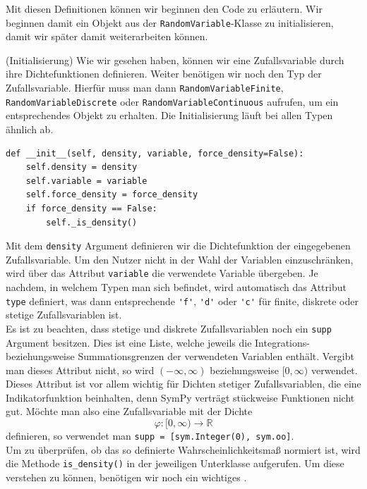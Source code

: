 Mit diesen Definitionen können wir beginnen den Code zu erläutern. Wir beginnen damit ein Objekt aus der \lstinline|RandomVariable|-Klasse zu initialisieren, damit wir später damit weiterarbeiten können.

\begin{Code}{(Initialisierung)}
\hypertarget{Code:Initialisierung}{}Wie wir gesehen haben, können wir eine Zufallsvariable durch ihre Dichtefunktionen definieren. Weiter benötigen wir noch den Typ der Zufallsvariable. Hierfür muss man dann \lstinline|RandomVariableFinite|, \lstinline|RandomVariableDiscrete| oder \lstinline|RandomVariableContinuous| aufrufen, um ein entsprechendes Objekt zu erhalten. Die Initialisierung läuft bei allen Typen ähnlich ab.
\begin{lstlisting}
def __init__(self, density, variable, force_density=False):
    self.density = density
    self.variable = variable
    self.force_density = force_density
    if force_density == False:
        self._is_density()
\end{lstlisting}
Mit dem \lstinline|density| Argument definieren wir die Dichtefunktion der eingegebenen Zufallsvariable. Um den Nutzer nicht in der Wahl der Variablen einzuschränken, wird über das Attribut \lstinline|variable| die verwendete Variable übergeben. Je nachdem, in welchem Typen man sich befindet, wird automatisch das Attribut \lstinline|type| definiert, was dann entsprechende \lstinline|'f'|, \lstinline|'d'| oder \lstinline|'c'| für finite, diskrete oder stetige Zufallsvariablen ist.\\

Es ist zu beachten, dass stetige und diskrete Zufallsvariablen noch ein \lstinline|supp| Argument besitzen. Dies ist eine Liste, welche jeweils die Integrations- beziehungsweise Summationsgrenzen der verwendeten Variablen enthält. Vergibt man dieses Attribut nicht, so wird $(- \infty, \infty)$ beziehungsweise $[0, \infty)$ verwendet. Dieses Attribut ist vor allem wichtig für Dichten stetiger Zufallsvariablen, die eine Indikatorfunktion beinhalten, denn SymPy verträgt stückweise Funktionen  nicht gut. Möchte man also eine Zufallsvariable mit der Dichte
\[\varphi: [0, \infty) \rightarrow \mathbb{R}\]
definieren, so verwendet man \lstinline|supp = [sym.Integer(0), sym.oo]|.\\
Um zu überprüfen, ob das so definierte Wahrscheinlichkeitsmaß normiert ist, wird die Methode \lstinline|is_density()| in der jeweiligen Unterklasse aufgerufen. Um diese verstehen zu können, benötigen wir noch ein wichtiges \hyperlink{Kor:Dichtekorollar}{}.
\end{Code}

